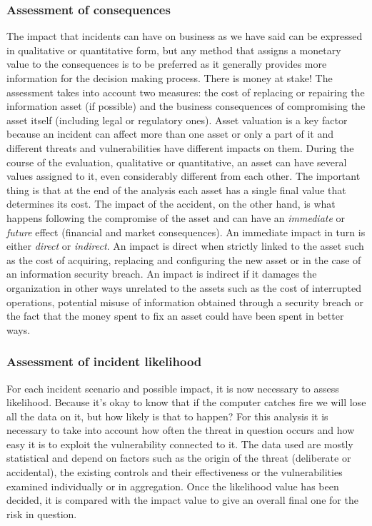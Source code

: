\subsubsection{Assessment of consequences}
The impact that incidents can have on business as we have said can be expressed in qualitative or quantitative form, but any method that assigns a monetary value to the consequences is to be preferred as it generally provides more information for the decision making process. There is money at stake! The assessment takes into account two measures: the cost of replacing or repairing the information asset (if possible) and the business consequences of compromising the asset itself (including legal or regulatory ones). Asset valuation is a key factor because an incident can affect more than one asset or only a part of it and different threats and vulnerabilities have different impacts on them. During the course of the evaluation, qualitative or quantitative, an asset can have several values assigned to it, even considerably different from each other. The important thing is that at the end of the analysis each asset has a single final value that determines its cost. The impact of the accident, on the other hand, is what happens following the compromise of the asset and can have an \textit{immediate} or \textit{future} effect (financial and market consequences). An immediate impact in turn is either \textit{direct} or \textit{indirect}. An impact is direct when strictly linked to the asset such as the cost of acquiring, replacing and configuring the new asset or in the case of an information security breach. An impact is indirect if it damages the organization in other ways unrelated to the assets such as the cost of interrupted operations, potential misuse of information obtained through a security breach or the fact that the money spent to fix an asset could have been spent in better ways.
\subsubsection{Assessment of incident likelihood}
For each incident scenario and possible impact, it is now necessary to assess likelihood. Because it's okay to know that if the computer catches fire we will lose all the data on it, but how likely is that to happen? For this analysis it is necessary to take into account how often the threat in question occurs and how easy it is to exploit the vulnerability connected to it. The data used are mostly statistical and depend on factors such as the origin of the threat (deliberate or accidental), the existing controls and their effectiveness or the vulnerabilities examined individually or in aggregation. Once the likelihood value has been decided, it is compared with the impact value to give an overall final one for the risk in question.
